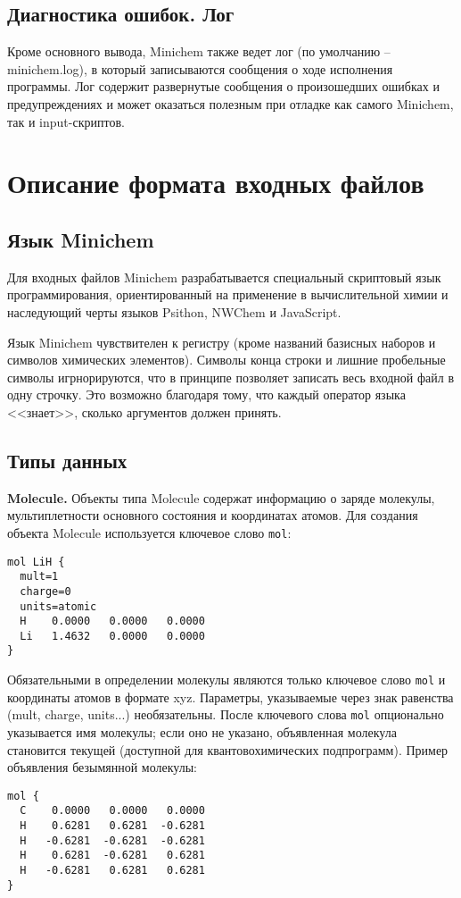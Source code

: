 \documentclass[a4paper]{book}
\begin{document}
\section{Диагностика ошибок. Лог}
Кроме основного вывода, Minichem также ведет лог
(по умолчанию -- minichem.log), в который записываются сообщения о ходе исполнения программы. Лог содержит развернутые сообщения о произошедших
ошибках и предупреждениях и может оказаться полезным при отладке как самого Minichem, так и input-скриптов.

\chapter{Описание формата входных файлов}
\section{Язык Minichem}
Для входных файлов Minichem разрабатывается специальный скриптовый язык программирования, ориентированный на применение в вычислительной химии
и наследующий черты языков Psithon, NWChem и JavaScript.

Язык Minichem чувствителен к регистру (кроме названий базисных наборов и символов химических элементов). Символы конца строки и лишние пробельные символы
игрнорируются, что в принципе позволяет записать весь входной файл в одну строчку. Это возможно благодаря тому, что каждый оператор языка <<знает>>, сколько
аргументов должен принять.

\section{Типы данных}
\textbf{Molecule.} Объекты типа Molecule содержат информацию о заряде молекулы, мультиплетности основного состояния и координатах атомов.
Для создания объекта Molecule используется ключевое слово \texttt{mol}:
\begin{lstlisting}
mol LiH {
  mult=1
  charge=0
  units=atomic
  H    0.0000   0.0000   0.0000
  Li   1.4632   0.0000   0.0000
}
\end{lstlisting}
Обязательными в определении молекулы являются только ключевое слово \texttt{mol} и координаты атомов в формате xyz.
Параметры, указываемые через знак равенства (mult, charge, units...) необязательны.
После ключевого слова \texttt{mol} опционально указывается имя молекулы; если оно не указано, объявленная
молекула становится текущей (доступной для квантовохимических подпрограмм). Пример объявления безымянной молекулы:
\begin{lstlisting}
mol {
  C    0.0000   0.0000   0.0000
  H    0.6281   0.6281  -0.6281
  H   -0.6281  -0.6281  -0.6281
  H    0.6281  -0.6281   0.6281
  H   -0.6281   0.6281   0.6281
}
\end{lstlisting}
\end{document}

